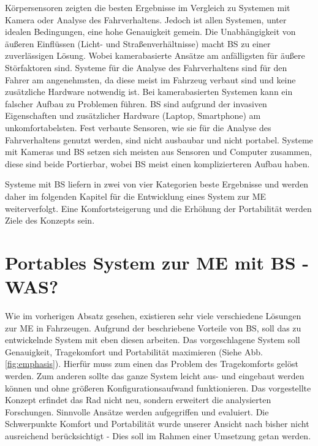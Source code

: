 {Körpersensoren zeigten die besten Ergebnisse im Vergleich zu Systemen mit Kamera oder Analyse des Fahrverhaltens. Jedoch ist allen Systemen, unter idealen Bedingungen, eine hohe Genauigkeit gemein.
Die Unabhängigkeit von äußeren Einflüssen (Licht- und Straßenverhältnisse) macht \acl{BS} zu einer zuverlässigen Lösung. Wobei kamerabasierte Ansätze am anfälligsten für äußere Störfaktoren sind. 
Systeme für die Analyse des Fahrverhaltens sind für den Fahrer am angenehmsten, da diese meist im Fahrzeug verbaut sind und keine zusätzliche Hardware notwendig ist. Bei kamerabasierten Systemen kann ein falscher Aufbau zu Problemen führen. \acl{BS} sind aufgrund der invasiven Eigenschaften und zusätzlicher Hardware (Laptop, Smartphone) am unkomfortabelsten. 
Fest verbaute Sensoren, wie sie für die Analyse des Fahrverhaltens genutzt werden, sind nicht ausbaubar und nicht portabel. Systeme mit Kameras und \acl{BS} setzen sich meisten aus Sensoren und Computer zusammen, diese sind beide Portierbar, wobei \acl{BS} meist einen komplizierteren Aufbau haben.

Systeme mit \acl{BS} liefern in zwei von vier Kategorien beste Ergebnisse und werden daher im folgenden Kapitel für die Entwicklung eines System zur \acl{ME} weiterverfolgt. Eine Komfortsteigerung und die Erhöhung der Portabilität werden Ziele des Konzepts sein.

\section{Portables System zur \acl{ME} mit \acl{BS} - WAS?}
\label{chap:prop}
Wie im vorherigen Absatz gesehen, existieren sehr viele verschiedene Lösungen zur \acl{ME} in Fahrzeugen. Aufgrund der beschriebene Vorteile von \acl{BS}, soll das zu entwickelnde System mit eben diesen arbeiten. Das vorgeschlagene System soll Genauigkeit, Tragekomfort und Portabilität maximieren (Siehe Abb. \ref{fig:emphasis}). Hierfür muss zum einen das Problem des Tragekomforts gelöst werden. Zum anderen sollte das ganze System leicht aus- und eingebaut werden können und ohne größeren Konfigurationsaufwand funktionieren. 
Das vorgestellte Konzept erfindet das Rad nicht neu, sondern erweitert die analysierten Forschungen. Sinnvolle Ansätze werden aufgegriffen und evaluiert. Die Schwerpunkte Komfort und Portabilität wurde unserer Ansicht nach bisher nicht ausreichend berücksichtigt - Dies soll im Rahmen einer Umsetzung getan werden. \\

}
